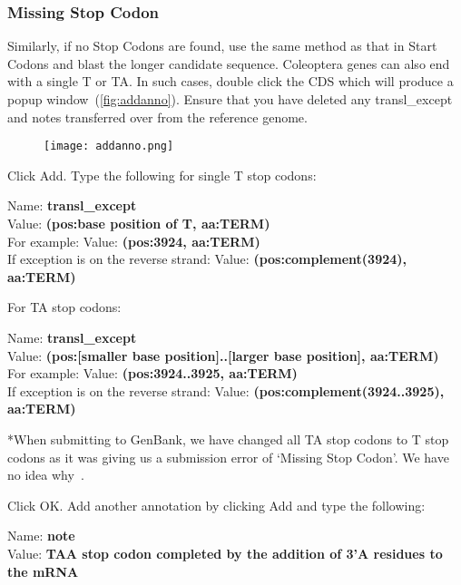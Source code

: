 \documentclass[11pt]{article}
\begin{document}
\subsubsection{Missing Stop Codon}
\label{stopcodon}
Similarly, if no Stop Codons are found, use the same method as that in Start Codons and blast the longer candidate sequence. Coleoptera genes can also end with a single T or TA. In such cases, double click the CDS which will produce a popup window~(\autoref{fig:addanno}). Ensure that you have deleted any transl\_except and notes transferred over from the reference genome. 

\begin{figure}[H]
  \centering
    \texttt{[image: addanno.png]}
  \label{fig:addanno}
\end{figure}

Click Add. Type the following for single T stop codons: 
\begin{displayquote}
Name: \textbf{transl\_except} \\
Value: \textbf{(pos:base position of T, aa:TERM)} \\
For example: Value: \textbf{(pos:3924, aa:TERM)} \\
If exception is on the reverse strand: Value: \textbf{(pos:complement(3924), aa:TERM)} \\
\end{displayquote}

For TA stop codons: 
\begin{displayquote}
Name: \textbf{transl\_except} \\ 
Value: \textbf{(pos:[smaller base position]..[larger base position], aa:TERM)} \\
For example: Value:\textbf{ (pos:3924..3925, aa:TERM)} \\
If exception is on the reverse strand: Value: \textbf{(pos:complement(3924..3925), aa:TERM)} 
\end{displayquote}
\begin{displayquote}
\footnotesize{*When submitting to GenBank, we have changed all TA stop codons to T stop codons as it was giving us a submission error of `Missing Stop Codon'. We have no idea why~\frownie.} \\
\end{displayquote}

Click OK. Add another annotation by clicking Add and type the following: 
\begin{displayquote}
Name: \textbf{note} \\
Value: \textbf{TAA stop codon completed by the addition of 3'A residues to the mRNA} 
\end{displayquote}
\end{document}
